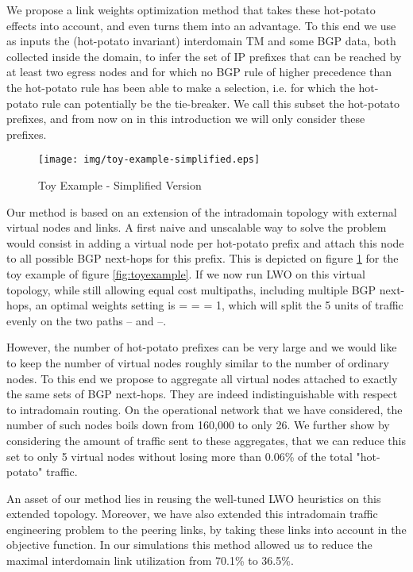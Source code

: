 \documentclass{acm_proc_article-sp}
\begin{document}
We propose a link weights optimization method that takes
these hot-potato effects into account, and even turns them into an
advantage. To this end we use as inputs the (hot-potato invariant)
interdomain TM and some BGP data, both collected inside the domain, to
infer the set of IP prefixes that can be reached by at least two
egress nodes and for which no BGP rule of higher precedence than the
hot-potato rule has been able to make a selection, i.e. for which the
hot-potato rule can potentially be the tie-breaker. We call this
subset the hot-potato prefixes, and from now on in this introduction
we will only consider these prefixes. 

\begin{figure}[htbp]
  \centering
  \texttt{[image: img/toy-example-simplified.eps]}
  \caption{Toy Example - Simplified Version}
  \label{fig:toyexample-simplified}
\end{figure}

Our method is based on an extension of the intradomain topology with
external virtual nodes and links. A first naive and unscalable way to
solve the problem would consist in adding a virtual node per
hot-potato prefix and attach this node to all possible BGP next-hops
for this prefix. This is depicted on figure \ref{fig:toyexample-simplified} for the toy example
of figure \ref{fig:toyexample}. If we now run LWO on this virtual
topology, while still allowing equal cost multipaths, including
multiple BGP next-hops, an optimal weights setting is { =  = 
  = 1}, which will split the 5 units of traffic evenly on the two
paths -- and --. 

However, the number of hot-potato prefixes can be very large and we
would like to keep the number of virtual nodes roughly similar to the
number of ordinary nodes. To this end we propose to aggregate all
virtual nodes attached to exactly the same sets of BGP next-hops. They
are indeed indistinguishable with respect to intradomain routing. On
the operational network that we have considered, the number of such
nodes boils down from 160,000 to only 26. We further show by
considering the amount of traffic sent to these aggregates, that we
can reduce this set to only 5 virtual nodes without losing more than
0.06\% of the total "hot-potato" traffic. 

An asset of our method lies in reusing the well-tuned LWO
heuristics on this extended topology. Moreover, we have also extended
this intradomain traffic engineering problem to the
peering links, by taking these links into account in the objective
function. In our simulations this method allowed us to reduce the maximal
interdomain link utilization from 70.1\% to 36.5\%.
\end{document}
